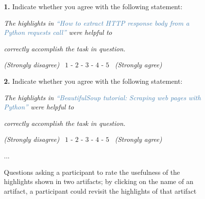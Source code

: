 \bigskip
\begin{figure}[h!]
\begin{mdframed}[backgroundcolor=gray!15] 
\begin{scriptsize}

\noindent \textbf{1.} Indicate whether you agree with the following statement:

\medskip

\quad \textit{The highlights in \textcolor{steelblue}{``How to extract HTTP response body from a Python requests call''} were helpful to} 

\quad \textit{correctly accomplish the task in question.}  \smallskip

\smallskip

\quad \quad \textit{(Strongly disagree)} ~$1$ - $2$ - $3$ - $4$ - $5$ ~\textit{(Strongly agree)} 


\bigskip


\noindent \textbf{2.} Indicate whether you agree with the following statement:

\medskip

\quad \textit{The highlights in \textcolor{steelblue}{``BeautifulSoup tutorial: Scraping web pages with Python''} were helpful to} 

\quad \textit{correctly accomplish the task in question.}  \smallskip

\smallskip

\quad \quad \textit{(Strongly disagree)} ~$1$ - $2$ - $3$ - $4$ - $5$ ~\textit{(Strongly agree)} 

\centering 

...

\end{scriptsize}
\end{mdframed}
\caption{Questions asking a participant to rate the usefulness of the highlights shown in two artifacts; by clicking on the name of an artifact, a participant could revisit the highlights of that artifact}
\label{fig:experiment-rating}
\end{figure}

    
